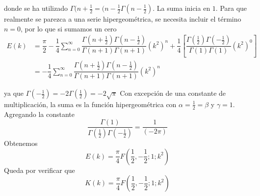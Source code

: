 donde se ha utilizado $\Gamma(n+ \frac{1}{2} = (n-\frac{1}{2} \Gamma(n-\frac{1}{2})$. La suma inicia en $1$. Para que realmente se parezca a una serie hipergeométrica, se necesita incluir el término $n=0$, por lo que si sumamos un cero
\[ \begin{split}
E(k) &= \dfrac{\pi}{2} - \dfrac{1}{4} \sum_{n=0}^{\infty} \dfrac{\Gamma(n+\frac{1}{2}) \Gamma(n-\frac{1}{2})}{\Gamma(n+1) \Gamma(n+1)} (k^{2})^{n} + \dfrac{1}{4} \left[ \dfrac{\Gamma(\frac{1}{2}) \Gamma(-\frac{1}{2})}{\Gamma(1) \Gamma(1)} (k^{2})^{0}  \right] \\
&= - \dfrac{1}{4} \sum_{n=0}^{\infty} \dfrac{\Gamma(n + \frac{1}{2}) \Gamma(n - \frac{1}{2})}{\Gamma(n+1) \Gamma(n+1)} (k^{2})^{n}
\end{split} \]

ya que $\Gamma(- \frac{1}{2} ) = -2 \Gamma( \frac{1}{2} ) = - 2 \sqrt{\pi}$
Con excepción de una constante de multiplicación, la suma es la función hipergeométrica con $\alpha=\frac{1}{2}= \beta$ y $\gamma=1$. Agregando la constante 
\[ \dfrac{\Gamma(1)}{\Gamma( \frac{1}{2} )\Gamma(- \frac{1}{2}) } = \dfrac{1}{(-2 \pi)} \]
Obtenemos
\begin{equation}
E(k) = \dfrac{\pi}{4} F(\frac{1}{2}, -\frac{1}{2}; 1; k^{2})
\label{eq:ecuacion_11_25}
\end{equation}
Queda por verificar que
\begin{equation}
K(k) = \dfrac{\pi}{4} F(\frac{1}{2}, -\frac{1}{2}; 1; k^{2})
\label{ecuacion_11_26}
\end{equation}
